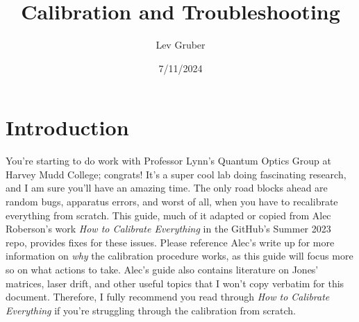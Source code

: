 \documentclass{paper}[11pt]
\title{Calibration and Troubleshooting}
\author{Lev Gruber}
\date{7/11/2024}
\begin{document}
\maketitle 

\tableofcontents
\newpage
\section{Introduction}
You're starting to do work with Professor Lynn's Quantum Optics Group at Harvey Mudd College; congrats! It's a super cool lab doing fascinating research, and I am sure you'll have an amazing time. The only road blocks ahead are random bugs, apparatus errors, and worst of all, when you have to recalibrate everything from scratch. This guide, much of it adapted or copied from Alec Roberson's work \textit{How to Calibrate Everything} in the GitHub's Summer 2023 repo, provides fixes for these issues. Please reference Alec's write up for more information on \textit{why} the calibration procedure works, as this guide will focus more so on what actions to take. Alec's guide also contains literature on Jones' matrices, laser drift, and other useful topics that I won't copy verbatim for this document. Therefore, I fully recommend you read through 
\textit{How to Calibrate Everything} if you're struggling through the calibration from scratch.
\end{document}
